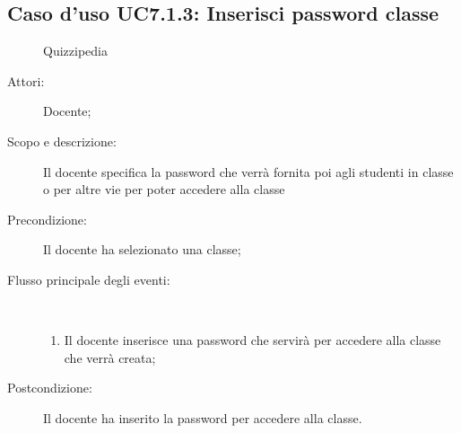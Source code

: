 \subsection{Caso d'uso UC7.1.3: Inserisci password classe}
	\begin{figure}[H]
		\centering
		\begin{resizedtikzpicture}{\textwidth}
		\begin{umlsystem}[x=0, fill=lightgray!20]{Quizzipedia}
		\end{umlsystem}
		\end{resizedtikzpicture}
		\caption{}
	\end{figure}
\begin{description}
\item[Attori:] Docente;
\item[Scopo e descrizione:] Il docente specifica la password che verrà fornita poi agli studenti in classe o per altre vie per poter accedere alla classe
      \item[Precondizione:] Il docente ha selezionato una classe;

        \item[Flusso principale degli eventi:] \ 
 \begin{enumerate}
          \item Il docente inserisce una password che servirà per accedere alla classe che verrà creata;

      \end{enumerate}
    \item[Postcondizione:] Il docente ha inserito la password per accedere alla classe.
  \end{description}
\hypertarget{UC7.2}{}
